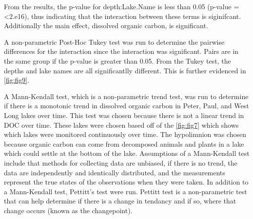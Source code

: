 \documentclass[12pt,]{article}
\newenvironment{Shaded}{\begin{snugshade}}{\end{snugshade}}
\newcommand{\KeywordTok}[1]{\textcolor[rgb]{0.13,0.29,0.53}{\textbf{#1}}}
\newcommand{\StringTok}[1]{\textcolor[rgb]{0.31,0.60,0.02}{#1}}
\newcommand{\CommentTok}[1]{\textcolor[rgb]{0.56,0.35,0.01}{\textit{#1}}}
\newcommand{\OperatorTok}[1]{\textcolor[rgb]{0.81,0.36,0.00}{\textbf{#1}}}
\newcommand{\NormalTok}[1]{#1}
\begin{document}
From the results, the p-value for depth:Lake.Name is less than 0.05
(p-value = \textless{}2.e16), thus indicating that the interaction
between these terms is siginifcant. Additionally the main effect,
dissolved organic carbon, is significant.

A non-parametric Post-Hoc Tukey test was run to determine the pairwise
differences for the interaction since the interaction was significant.
Pairs are in the same group if the p-value is greater than 0.05. From
the Tukey test, the depths and lake names are all significantlly
different. This is further evidenced in \autoref{fig:fig9}.

\begin{Shaded}
\end{Shaded}

A Mann-Kendall test, which is a non-parametric trend test, was run to
determine if there is a monotonic trend in dissolved organic carbon in
Peter, Paul, and West Long lakes over time. This test was chosen because
there is not a linear trend in DOC over time. These lakes were chosen
based off of the \autoref{fig:fig7} which shows which lakes were
monitored continuously over time. The hypolimnion was chosen because
organic carbon can come from decomposed animals and plants in a lake
which could settle at the bottom of the lake. Assumptions of a
Mann-Kendall test include that methods for collecting data are unbiased,
if there is no trend, the data are independently and identically
distributed, and the measurements represent the true states of the
observations when they were taken. In addition to a Mann-Kendall test,
Pettitt's test were run. Pettitt test is a non-parametric test that can
help determine if there is a change in tendancy and if so, where that
change occurs (known as the changepoint).
\end{document}
